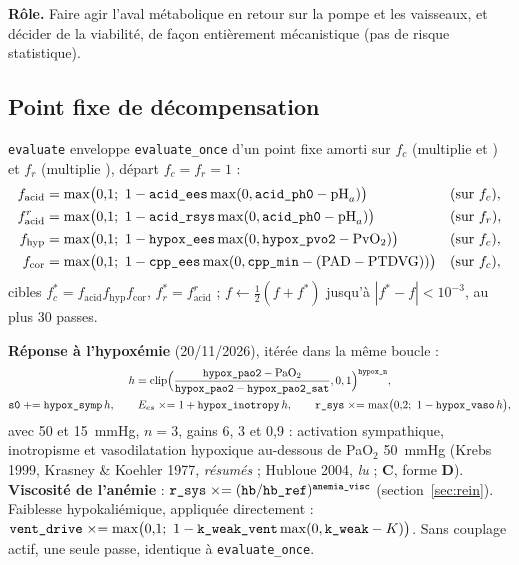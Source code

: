 \documentclass[10pt,a4paper]{article}
\newcommand{\cmd}[1]{\texttt{#1}}
\newcommand{\vp}[1]{\text{\texttt{\detokenize{#1}}}}
\newcommand{\evC}{\textcolor{orange!80!black}{\textbf{C}}}
\newcommand{\evD}{\textcolor{red!70!black}{\textbf{D}}}
\newcommand{\acc}[1]{\textsl{#1}}
\begin{document}
\textbf{Rôle.} Faire agir l'aval métabolique en retour sur la pompe et les vaisseaux, et décider de la viabilité, de façon entièrement mécanistique (pas de risque statistique).

\subsection{Point fixe de décompensation}
\cmd{evaluate} enveloppe \cmd{evaluate\_once} d'un point fixe amorti sur $f_c$ (multiplie \vp{ees_lv} et \vp{ees_rv}) et $f_r$ (multiplie \vp{r_sys}), départ $f_c = f_r = 1$ :
\begin{align}
f_\text{acid} &= \max\bigl(0{,}1;\ 1 - \vp{acid_ees}\max(0, \vp{acid_ph0} - \text{pH}_a)\bigr) &&\text{(sur } f_c\text{)},\\
f_\text{acid}^{r} &= \max\bigl(0{,}1;\ 1 - \vp{acid_rsys}\max(0, \vp{acid_ph0} - \text{pH}_a)\bigr) &&\text{(sur } f_r\text{)},\\
f_\text{hyp} &= \max\bigl(0{,}1;\ 1 - \vp{hypox_ees}\max(0, \vp{hypox_pvo2} - \text{PvO}_2)\bigr) &&\text{(sur } f_c\text{)},\\
f_\text{cor} &= \max\bigl(0{,}1;\ 1 - \vp{cpp_ees}\max(0, \vp{cpp_min} - (\text{PAD} - \text{PTDVG}))\bigr) &&\text{(sur } f_c\text{)},
\end{align}
cibles $f_c^* = f_\text{acid}f_\text{hyp}f_\text{cor}$, $f_r^* = f_\text{acid}^r$ ; $f \leftarrow \tfrac12(f + f^*)$ jusqu'à $|f^* - f| < 10^{-3}$, au plus 30 passes.

\textbf{Réponse à l'hypoxémie} (20/11/2026), itérée dans la même boucle :
\begin{gather}
h = \mathrm{clip}\Bigl(\frac{\vp{hypox_pao2} - \text{PaO}_2}{\vp{hypox_pao2} - \vp{hypox_pao2_sat}}, 0, 1\Bigr)^{\vp{hypox_n}},\\
\vp{s0} \mathrel{+}= \vp{hypox_symp}\,h,\qquad E_{es} \mathrel{\times}= 1 + \vp{hypox_inotropy}\,h,\qquad \vp{r_sys} \mathrel{\times}= \max\bigl(0{,}2;\ 1 - \vp{hypox_vaso}\,h\bigr),
\end{gather}
avec 50 et 15~mmHg, $n = 3$, gains 6, 3 et 0,9 : activation sympathique, inotropisme et vasodilatation hypoxique au-dessous de PaO$_2$ 50~mmHg (Krebs 1999, Krasney \& Koehler 1977, \acc{résumés} ; Hubloue 2004, \acc{lu} ; \evC{}, forme \evD{}). \textbf{Viscosité de l'anémie} : $\vp{r_sys} \mathrel{\times}= (\vp{hb}/\vp{hb_ref})^{\vp{anemia_visc}}$ (section~\ref{sec:rein}). Faiblesse hypokaliémique, appliquée directement : $\vp{vent_drive} \mathrel{\times}= \max\bigl(0{,}1;\ 1 - \vp{k_weak_vent}\max(0, \vp{k_weak} - K)\bigr)$. Sans couplage actif, une seule passe, identique à \cmd{evaluate\_once}.
\end{document}
